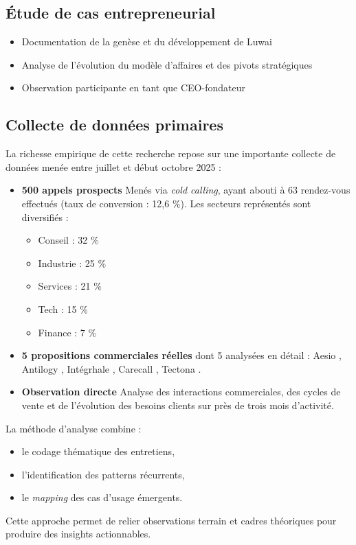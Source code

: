 \subsection{Étude de cas entrepreneurial}
\begin{itemize}
    \item Documentation de la genèse et du développement de Luwai
    \item Analyse de l'évolution du modèle d'affaires et des pivots stratégiques
    \item Observation participante en tant que CEO-fondateur
\end{itemize}

\subsection{Collecte de données primaires}
La richesse empirique de cette recherche repose sur une importante collecte de données menée entre juillet et début octobre 2025 :
\medskip
\begin{itemize}
    \item \textbf{500 appels prospects}
    Menés via \textit{cold calling}, ayant abouti à 63 rendez-vous effectués (taux de conversion : 12,6 \%).
    Les secteurs représentés sont diversifiés :
    \begin{itemize}
        \item Conseil : 32 \%
        \item Industrie : 25 \%
        \item Services : 21 \%
        \item Tech : 15 \%
        \item Finance : 7 \%
    \end{itemize}

    \item \textbf{5 propositions commerciales réelles} dont 5 analysées en détail :
    Aesio \cite{luwai2025aesio}, Antilogy \cite{luwai2025antilogy}, Intégrhale \cite{luwai2025integrhale}, Carecall \cite{luwai2025carecall}, Tectona \cite{luwai2025tectona}.

    \item \textbf{Observation directe}
    Analyse des interactions commerciales, des cycles de vente et de l’évolution des besoins clients sur près de trois mois d’activité.
\end{itemize}

\medskip
La méthode d’analyse combine :
\begin{itemize}
    \item le codage thématique des entretiens,
    \item l’identification des patterns récurrents,
    \item le \textit{mapping} des cas d’usage émergents.
\end{itemize}
\medskip
Cette approche permet de relier observations terrain et cadres théoriques pour produire des insights actionnables.

